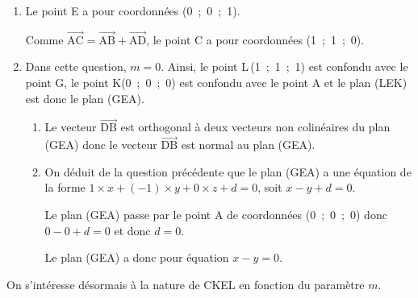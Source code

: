 \documentclass[10pt]{article}
\providecommand{\vectt}[1]{\overrightarrow{\mathrm{#1}}}
\begin{document}
\begin{enumerate}
\item Le point E a pour coordonnées (0~;~0~;~1).

Comme $\vectt{AC}=\vectt{AB}+\vectt{AD}$, le point C a pour coordonnées (1~;~1~;~0).

\item Dans cette question, $m = 0$. Ainsi, le point L\,(1~;~1~;~1) est confondu avec le point G, le point K(0~;~0~;~0) est confondu avec le point A et le plan (LEK) est donc le plan (GEA).
	\begin{enumerate}
		\item 
{}		
		
Le vecteur $\vectt{DB}$	est orthogonal à deux vecteurs non colinéaires du plan (GEA) donc le vecteur $\vectt{DB}$ est normal au plan (GEA).
		
		\item 
On déduit de la question précédente que le plan (GEA) a une équation de la forme $1\times x + (-1)\times y + 0\times z + d =0$, soit $x-y+d=0$.

Le plan (GEA) passe par le point A de coordonnées (0~;~0~;~0) donc $0-0+d=0$ et donc $d=0$.

Le plan (GEA) a donc pour équation $x-y=0$.
	\end{enumerate}
\end{enumerate}

On s'intéresse désormais à la nature de CKEL en fonction du paramètre $m$.
\end{document}
